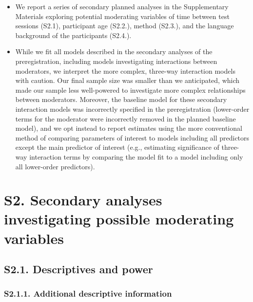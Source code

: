 \documentclass[
  man, donotrepeattitle,floatsintext]{apa6}
\begin{document}
\begin{itemize}
\item
  We report a series of secondary planned analyses in the Supplementary Materials exploring potential moderating variables of time between test sessions (S2.1), participant age (S2.2.), method (S2.3.), and the language background of the participants (S2.4.).
\item
  While we fit all models described in the secondary analyses of the preregistration, including models investigating interactions between moderators, we interpret the more complex, three-way interaction models with caution. Our final sample size was smaller than we anticipated, which made our sample less well-powered to investigate more complex relationships between moderators. Moreover, the baseline model for these secondary interaction models was incorrectly specified in the preregistration (lower-order terms for the moderator were incorrectly removed in the planned baseline model), and we opt instead to report estimates using the more conventional method of comparing parameters of interest to models including all predictors except the main predictor of interest (e.g., estimating significance of three-way interaction terms by comparing the model fit to a model including only all lower-order predictors).
\end{itemize}

\newpage

\hypertarget{s2.-secondary-analyses-investigating-possible-moderating-variables}{%
\section{S2. Secondary analyses investigating possible moderating variables}\label{s2.-secondary-analyses-investigating-possible-moderating-variables}}

\hypertarget{s2.1.-descriptives-and-power}{%
\subsection{S2.1. Descriptives and power}\label{s2.1.-descriptives-and-power}}

\hypertarget{s2.1.1.-additional-descriptive-information}{%
\subsubsection{S2.1.1. Additional descriptive information}\label{s2.1.1.-additional-descriptive-information}}
\end{document}
